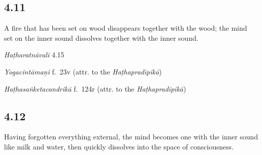 \begin{ekdosis}
\subsection*{4.11}
\begin{translation}[hp04_011]
A fire that has been set on wood disappears together with the wood; the mind set on the inner sound dissolves together with the inner sound.
\end{translation}


\begin{testimonia}[hp04_011]
\emph{Haṭharatnāvalī} 4.15
\begin{versinnote}
\end{versinnote}

\emph{Yogacintāmaṇi} f.~23v (attr. to the \emph{Haṭhapradīpikā})
\begin{versinnote}
\end{versinnote}

\emph{Haṭhasaṅketacandrikā} f.~124r (attr. to the \emph{Haṭhapradīpikā})
\begin{versinnote}
\end{versinnote}
\end{testimonia}


\subsection*{4.12}
\begin{translation}[hp04_012]
Having forgotten everything external, the mind becomes one with the inner sound like milk and water, then quickly dissolves into the space of consciousness.
\end{translation}


\end{ekdosis}

